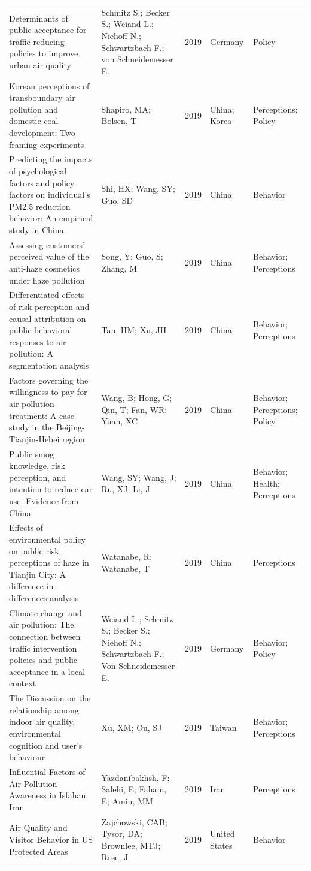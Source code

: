 {\begin{longtable}[t]{p{6cm}p{3cm}lp{3cm}p{3cm}}
Determinants of public acceptance for traffic-reducing policies to improve urban air quality & Schmitz S.; Becker S.; Weiand L.; Niehoff N.; Schwartzbach F.; von Schneidemesser E. & 2019 & Germany & Policy\\
Korean perceptions of transboundary air pollution and domestic coal development: Two framing experiments & Shapiro, MA; Bolsen, T & 2019 & China; Korea & Perceptions; Policy\\
Predicting the impacts of psychological factors and policy factors on individual's PM2.5 reduction behavior: An empirical study in China & Shi, HX; Wang, SY; Guo, SD & 2019 & China & Behavior\\
\addlinespace
Assessing customers' perceived value of the anti-haze cosmetics under haze pollution & Song, Y; Guo, S; Zhang, M & 2019 & China & Behavior; Perceptions\\
Differentiated effects of risk perception and causal attribution on public behavioral responses to air pollution: A segmentation analysis & Tan, HM; Xu, JH & 2019 & China & Behavior; Perceptions\\
Factors governing the willingness to pay for air pollution treatment: A case study in the Beijing-Tianjin-Hebei region & Wang, B; Hong, G; Qin, T; Fan, WR; Yuan, XC & 2019 & China & Behavior; Perceptions; Policy\\
Public smog knowledge, risk perception, and intention to reduce car use: Evidence from China & Wang, SY; Wang, J; Ru, XJ; Li, J & 2019 & China & Behavior; Health; Perceptions\\
Effects of environmental policy on public risk perceptions of haze in Tianjin City: A difference-in-differences analysis & Watanabe, R; Watanabe, T & 2019 & China & Perceptions\\
\addlinespace
Climate change and air pollution: The connection between traffic intervention policies and public acceptance in a local context & Weiand L.; Schmitz S.; Becker S.; Niehoff N.; Schwartzbach F.; Von Schneidemesser E. & 2019 & Germany & Behavior; Policy\\
The Discussion on the relationship among indoor air quality, environmental cognition and user's behaviour & Xu, XM; Ou, SJ & 2019 & Taiwan & Behavior; Perceptions\\
Influential Factors of Air Pollution Awareness in Isfahan, Iran & Yazdanibakhsh, F; Salehi, E; Faham, E; Amin, MM & 2019 & Iran & Perceptions\\
Air Quality and Visitor Behavior in US Protected Areas & Zajchowski, CAB; Tysor, DA; Brownlee, MTJ; Rose, J & 2019 & United States & Behavior\\

\end{longtable}}

